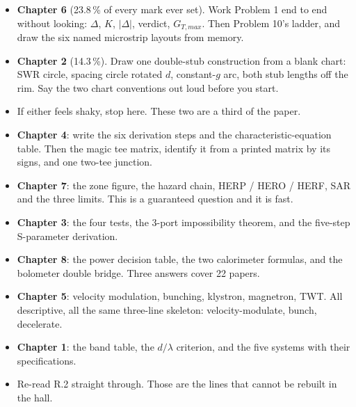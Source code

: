 \par{}\vspace{4pt}


\begin{itemize}
  \item \textbf{Chapter 6} (23.8\,\% of every mark ever set). Work Problem 1 end to end
    without looking: $\Delta$, $K$, $|\Delta|$, verdict, $G_{T,max}$. Then Problem 10's
    ladder, and draw the six named microstrip layouts from memory.
  \item \textbf{Chapter 2} (14.3\,\%). Draw one double-stub construction from a blank chart:
    SWR circle, spacing circle rotated $d$, constant-$g$ arc, both stub lengths off the rim.
    Say the two chart conventions out loud before you start.
  \item If either feels shaky, stop here. These two are a third of the paper.
\end{itemize}

\begin{itemize}
  \item \textbf{Chapter 4}: write the six derivation steps and the characteristic-equation
    table. Then the magic tee matrix, identify it from a printed matrix by its signs, and
    one two-tee junction.
  \item \textbf{Chapter 7}: the zone figure, the hazard chain, HERP / HERO / HERF, SAR and
    the three limits. This is a guaranteed question and it is fast.
  \item \textbf{Chapter 3}: the four tests, the 3-port impossibility theorem, and the
    five-step S-parameter derivation.
  \item \textbf{Chapter 8}: the power decision table, the two calorimeter formulas, and the
    bolometer double bridge. Three answers cover 22 papers.
\end{itemize}

\begin{itemize}
  \item \textbf{Chapter 5}: velocity modulation, bunching, klystron, magnetron, TWT. All
    descriptive, all the same three-line skeleton: velocity-modulate, bunch, decelerate.
  \item \textbf{Chapter 1}: the band table, the $d/\lambda$ criterion, and the five systems
    with their specifications.
  \item Re-read R.2 straight through. Those are the lines that cannot be rebuilt in the
    hall.
\end{itemize}

